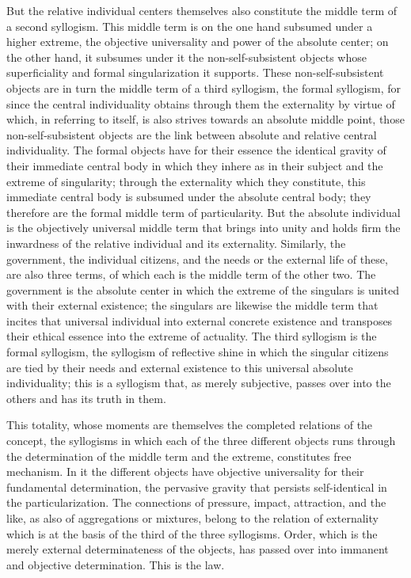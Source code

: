 But the relative individual centers themselves
also constitute the middle term of a second syllogism.
This middle term is on the one hand subsumed
under a higher extreme,
the objective universality and power of the absolute center;
on the other hand, it subsumes under it
the non-self-subsistent objects whose
superficiality and formal singularization it supports.
These non-self-subsistent objects are in turn
the middle term of a third syllogism,
the formal syllogism,
for since the central individuality obtains through
them the externality by virtue of which,
in referring to itself, is also strives
towards an absolute middle point,
those non-self-subsistent objects are
the link between absolute and relative central individuality.
The formal objects have for their essence
the identical gravity of their immediate central body
in which they inhere as in their subject
and the extreme of singularity;
through the externality which they constitute,
this immediate central body is subsumed under
the absolute central body;
they therefore are the formal middle term of particularity.
But the absolute individual is the objectively
universal middle term that brings into unity
and holds firm the inwardness of
the relative individual and its externality.
Similarly, the government, the individual citizens,
and the needs or the external life of these,
are also three terms,
of which each is the middle term of the other two.
The government is the absolute center
in which the extreme of the singulars is
united with their external existence;
the singulars are likewise the middle term that incites
that universal individual into external concrete existence
and transposes their ethical essence into the extreme of actuality.
The third syllogism is the formal syllogism,
the syllogism of reflective shine in which
the singular citizens are tied by their needs
and external existence to this universal
absolute individuality;
this is a syllogism that, as merely subjective,
passes over into the others and has its truth in them.

This totality, whose moments are themselves
the completed relations of the concept,
the syllogisms in which each of
the three different objects
runs through the determination of
the middle term and the extreme,
constitutes free mechanism.
In it the different objects have objective universality
for their fundamental determination,
the pervasive gravity that persists
self-identical in the particularization.
The connections of pressure, impact, attraction,
and the like, as also of aggregations or mixtures,
belong to the relation of externality
which is at the basis of the third of the three syllogisms.
Order, which is the merely external
determinateness of the objects,
has passed over into immanent
and objective determination.
This is the law.


